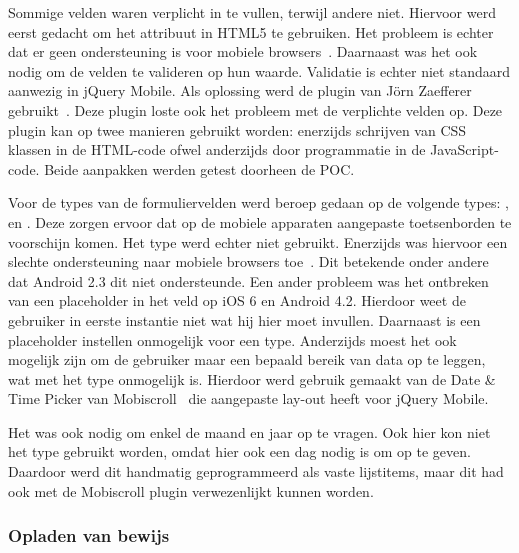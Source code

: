 Sommige velden waren verplicht in te vullen, terwijl andere niet. Hiervoor werd eerst gedacht om het  attribuut in HTML5 te gebruiken. Het probleem is echter dat er geen ondersteuning is voor mobiele browsers~\cite{Deveria2013}. Daarnaast was het ook nodig om de velden te valideren op hun waarde. Validatie is echter niet standaard aanwezig in jQuery Mobile. Als oplossing werd de plugin van Jörn Zaefferer gebruikt~\cite{Zaefferer2013}. Deze plugin loste ook het probleem met de verplichte velden op. Deze plugin kan op twee manieren gebruikt worden: enerzijds schrijven van CSS klassen in de HTML-code ofwel anderzijds door programmatie in de JavaScript-code. Beide aanpakken werden getest doorheen de POC. 

Voor de types van de formuliervelden werd beroep gedaan op de volgende types: ,  en . Deze zorgen ervoor dat op de mobiele apparaten aangepaste toetsenborden te voorschijn komen. Het  type werd echter niet gebruikt. Enerzijds was hiervoor een slechte ondersteuning naar mobiele browsers toe~\cite{Deveria2013b}. Dit betekende onder andere dat Android 2.3 dit niet ondersteunde. Een ander probleem was het ontbreken van een placeholder in het veld op iOS 6 en Android 4.2. Hierdoor weet de gebruiker in eerste instantie niet wat hij hier moet invullen. Daarnaast is een placeholder instellen onmogelijk voor een  type. Anderzijds moest het ook mogelijk zijn om de gebruiker maar een bepaald bereik van data op te leggen, wat met het  type onmogelijk is. Hierdoor werd gebruik gemaakt van de Date \& Time Picker van Mobiscroll~\cite{Mobiscroll2013} die aangepaste lay-out heeft voor jQuery Mobile.

Het was ook nodig om enkel de maand en jaar op te vragen. Ook hier kon niet het  type gebruikt worden, omdat hier ook een dag nodig is om op te geven. Daardoor werd dit handmatig geprogrammeerd als vaste lijstitems, maar dit had ook met de Mobiscroll plugin verwezenlijkt kunnen worden.

\subsubsection{Opladen van bewijs}

